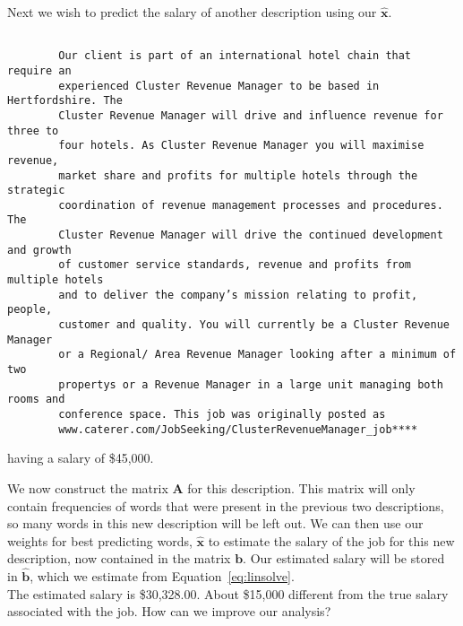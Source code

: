 \documentclass[12pt]{article}
\begin{document}
    Next we wish to predict the salary of another description using our
    $\bm{\hat{x}}$. 

    \begin{lstlisting}
    
        Our client is part of an international hotel chain that require an
        experienced Cluster Revenue Manager to be based in Hertfordshire. The
        Cluster Revenue Manager will drive and influence revenue for three to
        four hotels. As Cluster Revenue Manager you will maximise revenue,
        market share and profits for multiple hotels through the strategic
        coordination of revenue management processes and procedures. The
        Cluster Revenue Manager will drive the continued development and growth
        of customer service standards, revenue and profits from multiple hotels
        and to deliver the company’s mission relating to profit, people,
        customer and quality. You will currently be a Cluster Revenue Manager
        or a Regional/ Area Revenue Manager looking after a minimum of two
        propertys or a Revenue Manager in a large unit managing both rooms and
        conference space. This job was originally posted as
        www.caterer.com/JobSeeking/ClusterRevenueManager_job****

    \end{lstlisting} having a salary of \$45,000.
    
    \begin{center} 
        
        
    \end{center}

    We now construct the matrix $\bm{A}$ for this description. This matrix will
    only contain frequencies of words that were present in the previous two
    descriptions, so many words in this new description will be left out. We
    can then use our weights for best predicting words, $\bm{\hat{x}}$ to
    estimate the salary of the job for this new description, now contained in
    the matrix $\bm{b}$. Our estimated salary will be stored in $\bm{\hat{b}}$,
    which we estimate from Equation~\ref{eq:linsolve}. \\

    The estimated salary is \$30,328.00. About \$15,000 different from the true
    salary associated with the job. How can we improve our analysis?
\end{document}
